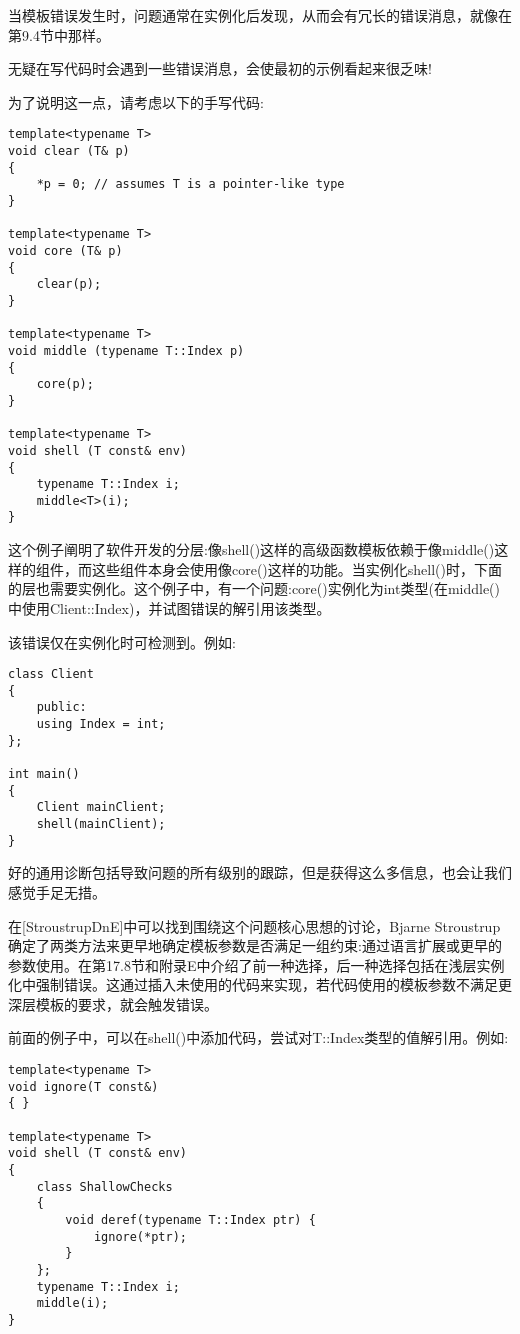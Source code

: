 当模板错误发生时，问题通常在实例化后发现，从而会有冗长的错误消息，就像在第9.4节中那样。

\begin{tcolorbox}[colback=webgreen!5!white,colframe=webgreen!75!black]
\hspace*{0.75cm}无疑在写代码时会遇到一些错误消息，会使最初的示例看起来很乏味!
\end{tcolorbox}

为了说明这一点，请考虑以下的手写代码:

\begin{lstlisting}[style=styleCXX]
template<typename T>
void clear (T& p)
{
	*p = 0; // assumes T is a pointer-like type
}

template<typename T>
void core (T& p)
{
	clear(p);
}

template<typename T>
void middle (typename T::Index p)
{
	core(p);
}

template<typename T>
void shell (T const& env)
{
	typename T::Index i;
	middle<T>(i);
}
\end{lstlisting}

这个例子阐明了软件开发的分层:像shell()这样的高级函数模板依赖于像middle()这样的组件，而这些组件本身会使用像core()这样的功能。当实例化shell()时，下面的层也需要实例化。这个例子中，有一个问题:core()实例化为int类型(在middle()中使用Client::Index)，并试图错误的解引用该类型。

该错误仅在实例化时可检测到。例如:

\begin{lstlisting}[style=styleCXX]
class Client
{
	public:
	using Index = int;
};

int main()
{
	Client mainClient;
	shell(mainClient);
}
\end{lstlisting}

好的通用诊断包括导致问题的所有级别的跟踪，但是获得这么多信息，也会让我们感觉手足无措。

在[StroustrupDnE]中可以找到围绕这个问题核心思想的讨论，Bjarne Stroustrup确定了两类方法来更早地确定模板参数是否满足一组约束:通过语言扩展或更早的参数使用。在第17.8节和附录E中介绍了前一种选择，后一种选择包括在浅层实例化中强制错误。这通过插入未使用的代码来实现，若代码使用的模板参数不满足更深层模板的要求，就会触发错误。

前面的例子中，可以在shell()中添加代码，尝试对T::Index类型的值解引用。例如:

\begin{lstlisting}[style=styleCXX]
template<typename T>
void ignore(T const&)
{ }

template<typename T>
void shell (T const& env)
{
	class ShallowChecks
	{
		void deref(typename T::Index ptr) {
			ignore(*ptr);
		}
	};
	typename T::Index i;
	middle(i);
}
\end{lstlisting}

